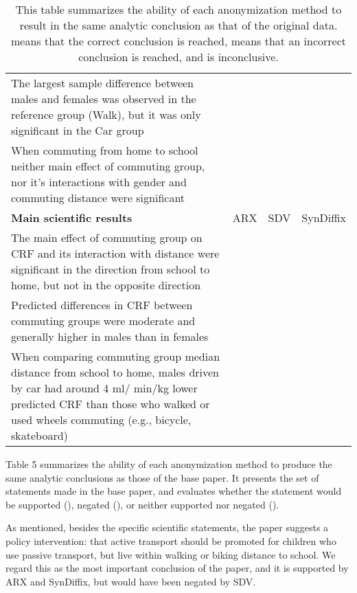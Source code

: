 \documentclass[10pt]{article}
\newcommand{\cmark}{\textcolor{green}{\ding{51}}}  %
\newcommand{\xmark}{\textcolor{red}{\ding{55}}}    %
\newcommand{\omark}{\textcolor{yellow}{\ding{109}}} %
\newcommand{\cmark}{\textbf{O }}
\newcommand{\xmark}{\textbf{X }}
\newcommand{\omark}{? }
\begin{document}
\begin{table}
\begin{center}
\begin{small}
\begin{tabularx}{\textwidth}{Xlll}
The largest sample difference between males and females was observed in the reference group (Walk), but it was only significant in the Car group & \omark & \omark & \omark \\
When commuting from home to school neither main effect of commuting group, nor it’s interactions with
gender and commuting distance were significant & \omark & \cmark & \cmark \\
\midrule
\textbf{Main scientific results}  & ARX & SDV & SynDiffix \\
The main effect of commuting group on CRF and its interaction with distance were significant in the
direction from school to home, but not in the opposite direction & \omark & \xmark & \omark \\
Predicted differences in CRF between commuting groups were moderate and generally higher in males than in females & \cmark & \xmark & \cmark \\
When comparing commuting group median distance from school to home, males driven by car had around 4 ml/
min/kg lower predicted CRF than those who walked or used wheels commuting (e.g., bicycle, skateboard) & \omark & \xmark & \omark \\



\bottomrule
\end{tabularx}
\caption{This table summarizes the ability of each anonymization method to result in the same analytic conclusion as that of the original data. \cmark means that the correct conclusion is reached, \xmark means that an incorrect conclusion is reached, and \omark is inconclusive.}
\label{tab:summary}
\end{small}
\end{center}
\end{table}

Table 5 summarizes the ability of each anonymization method to produce the same analytic conclusions as those of the base paper. It presents the set of statements made in the base paper, and evaluates whether the statement would be supported (\cmark), negated (\xmark), or neither supported nor negated (\omark).

As mentioned, besides the specific scientific statements, the paper suggests a policy intervention: that active transport should be promoted for children who use passive transport, but live within walking or biking distance to school. We regard this as the most important conclusion of the paper, and it is supported by ARX and SynDiffix, but would have been negated by SDV.
\end{document}
